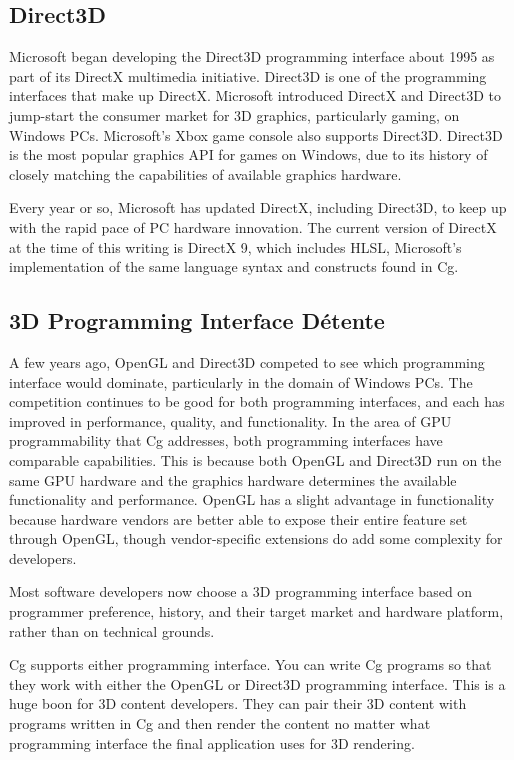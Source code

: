 \documentclass[../main.tex]{subfiles}
\begin{document}
\subsection*{Direct3D}

Microsoft began developing the Direct3D programming interface about 1995 as part of its DirectX multimedia initiative. Direct3D is one of the programming interfaces that make up DirectX. Microsoft introduced DirectX and Direct3D to jump-start the consumer market for 3D graphics, particularly gaming, on Windows PCs. Microsoft's Xbox game console also supports Direct3D. Direct3D is the most popular graphics API for games on Windows, due to its history of closely matching the capabilities of available graphics hardware.

Every year or so, Microsoft has updated DirectX, including Direct3D, to keep up with the rapid pace of PC hardware innovation. The current version of DirectX at the time of this writing is DirectX 9, which includes HLSL, Microsoft's implementation of the same language syntax and constructs found in Cg.

\subsection*{3D Programming Interface Détente}

A few years ago, OpenGL and Direct3D competed to see which programming interface would dominate, particularly in the domain of Windows PCs. The competition continues to be good for both programming interfaces, and each has improved in performance, quality, and functionality. In the area of GPU programmability that Cg addresses, both programming interfaces have comparable capabilities. This is because both OpenGL and Direct3D run on the same GPU hardware and the graphics hardware determines the available functionality and performance. OpenGL has a slight advantage in functionality because hardware vendors are better able to expose their entire feature set through OpenGL, though vendor-specific extensions do add some complexity for developers.

Most software developers now choose a 3D programming interface based on programmer preference, history, and their target market and hardware platform, rather than on technical grounds.

Cg supports either programming interface. You can write Cg programs so that they work with either the OpenGL or Direct3D programming interface. This is a huge boon for 3D content developers. They can pair their 3D content with programs written in Cg and then render the content no matter what programming interface the final application uses for 3D rendering.
\end{document}
